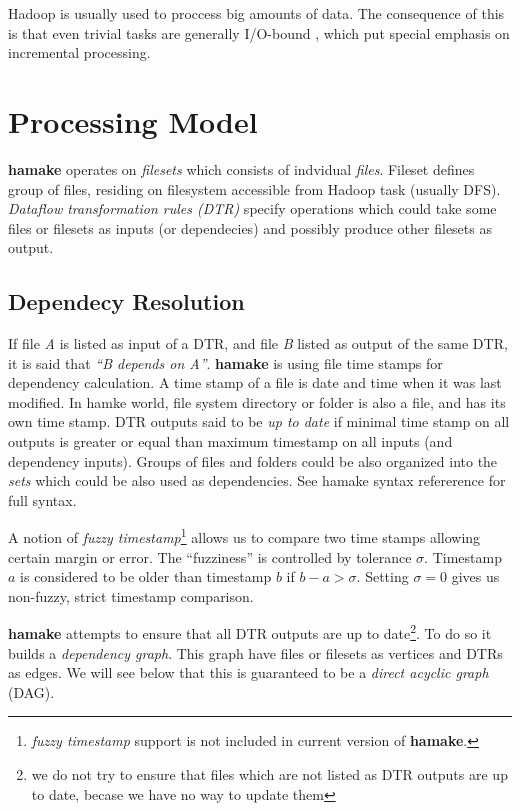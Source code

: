 \documentclass{article}
\begin{document}
Hadoop is usually used to proccess big amounts of data. The
consequence of this is that even trivial tasks are generally I/O-bound
\cite{hadoopattwitter},\cite{hs2010hadoopbench} which put special
emphasis on incremental processing.

\section{Processing Model}

\textbf{hamake} operates on \textit{filesets} which consists of indvidual
\textit{files}. Fileset defines group of files, residing on filesystem
accessible from Hadoop task (usually DFS). \textit{Dataflow
  transformation rules (DTR)} specify operations which could take some
files or filesets as inputs (or dependecies) and possibly produce
other filesets as output.

\subsection{Dependecy Resolution}

If file \textit{A} is listed as input of a DTR, and file \textit{B}
listed as output of the same DTR, it is said that \textit{``B depends
  on A''}. \textbf{hamake} is using file time stamps for dependency
calculation. A time stamp of a file is date and time when it was last
modified.  In hamke world, file system directory or folder is also a
file, and has its own time stamp. DTR outputs said to be \textit{up to
  date} if minimal time stamp on all outputs is greater or equal than
maximum timestamp on all inputs (and dependency inputs). Groups of
files and folders could be also organized into the \emph{sets} which
could be also used as dependencies. See hamake syntax
refererence\cite{hamakesyntax} for full syntax.

A notion of \textit{fuzzy timestamp}\footnote{\textit{fuzzy timestamp}
  support is not included in current version of \textbf{hamake}.}
allows us to compare two time stamps allowing certain margin or
error. The ``fuzziness'' is controlled by tolerance
$\sigma$. Timestamp $a$ is considered to be older than timestamp $b$
if $b-a>\sigma$. Setting $\sigma=0$ gives us non-fuzzy, strict
timestamp comparison.

\textbf{hamake} attempts to ensure that all DTR outputs are up to
date\footnote{we do not try to ensure that files which are not listed
  as DTR outputs are up to date, becase we have no way to update
  them}. To do so it builds a \textit{dependency graph}. This graph
have files or filesets as vertices and DTRs as edges. We will see
below that this is guaranteed to be a \textit{direct acyclic graph}
(DAG).
\end{document}
